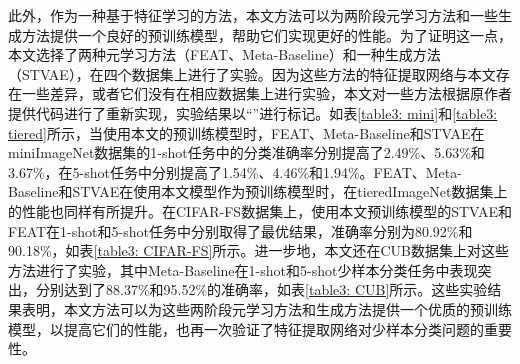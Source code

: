 此外，作为一种基于特征学习的方法，本文方法可以为两阶段元学习方法和一些生成方法提供一个良好的预训练模型，帮助它们实现更好的性能。为了证明这一点，本文选择了两种元学习方法（FEAT\cite{FEAT}、Meta-Baseline\cite{MetaBaseline}）和一种生成方法（STVAE\cite{STVAE}），在四个数据集上进行了实验。因为这些方法的特征提取网络与本文存在一些差异，或者它们没有在相应数据集上进行实验，本文对一些方法根据原作者提供代码进行了重新实现，实验结果以“\dag”进行标记。如表\ref{table3: mini}和\ref{table3: tiered}所示，当使用本文的预训练模型时，FEAT、Meta-Baseline和STVAE在miniImageNet数据集的1-shot任务中的分类准确率分别提高了2.49\%、5.63\%和3.67\%，在5-shot任务中分别提高了1.54\%、4.46\%和1.94\%。FEAT、Meta-Baseline和STVAE在使用本文模型作为预训练模型时，在tieredImageNet数据集上的性能也同样有所提升。在CIFAR-FS数据集上，使用本文预训练模型的STVAE和FEAT在1-shot和5-shot任务中分别取得了最优结果，准确率分别为80.92\%和90.18\%，如表\ref{table3: CIFAR-FS}所示。进一步地，本文还在CUB数据集上对这些方法进行了实验，其中Meta-Baseline在1-shot和5-shot少样本分类任务中表现突出，分别达到了88.37\%和95.52\%的准确率，如表\ref{table3: CUB}所示。这些实验结果表明，本文方法可以为这些两阶段元学习方法和生成方法提供一个优质的预训练模型，以提高它们的性能，也再一次验证了特征提取网络对少样本分类问题的重要性。

